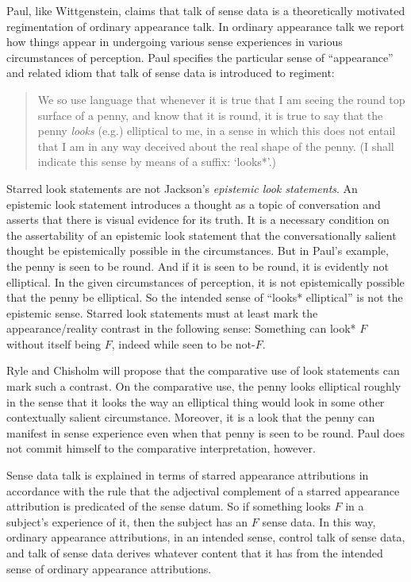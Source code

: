 \documentclass[11pt]{article}
\begin{document}
Paul, like Wittgenstein, claims that talk of sense data is a theoretically motivated regimentation of ordinary appearance talk. In ordinary appearance talk we report how things appear in undergoing various sense experiences in various circumstances of perception. Paul specifies the particular sense of ``appearance'' and related idiom that talk of sense data is introduced to regiment:
\begin{quote}
    We so use language that whenever it is true that I am seeing the round top surface of a penny, and know that it is round, it is true to say that the penny \emph{looks} (e.g.) elliptical to me, in a sense in which this does not entail that I am in any way deceived about the real shape of the penny. (I shall indicate this sense by means of a suffix: `looks*'.)
\end{quote}
Starred look statements are not Jackson's \emph{epistemic look statements}. An epistemic look statement introduces a thought as a topic of conversation and asserts that there is visual evidence for its truth. It is a necessary condition on the assertability of an epistemic look statement that the conversationally salient thought be epistemically possible in the circumstances. But in Paul's example, the penny is seen to be round. And if it is seen to be round, it is evidently not elliptical. In the given circumstances of perception, it is not epistemically possible that the penny be elliptical. So the intended sense of ``looks* elliptical'' is not the epistemic sense. Starred look statements must at least mark the appearance/reality contrast in the following sense: Something can look* \( F \) without itself being \( F \), indeed while seen to be not-\( F \). 

\begin{discussion}
	Ryle and Chisholm will propose that the comparative use of look statements can mark such a contrast. On the comparative use, the penny looks elliptical roughly in the sense that it looks the way an elliptical thing would look in some other contextually salient circumstance. Moreover, it is a look that the penny can manifest in sense experience even when that penny is seen to be round. Paul does not commit himself to the comparative interpretation, however.
\end{discussion}

Sense data talk is explained in terms of starred appearance attributions in accordance with the rule that the adjectival complement of a starred appearance attribution is predicated of the sense datum. So if something looks \( F \) in a subject's experience of it, then the subject has an \( F \) sense data. In this way, ordinary appearance attributions, in an intended sense, control talk of sense data, and talk of sense data derives whatever content that it has from the intended sense of ordinary appearance attributions.
\end{document}
